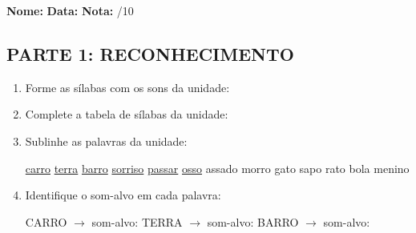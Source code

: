\begin{exercicio}

\noindent\textbf{Nome:} \underline{\hspace{3.2cm}} \quad \textbf{Data:} \underline{\hspace{1.6cm}} \quad \textbf{Nota:} \underline{\hspace{0.9cm}}/10


\subsection*{PARTE 1: RECONHECIMENTO}

\begin{enumerate}

  \item Forme as sílabas com os sons da unidade:

\begin{center}
\end{center}

  \item Complete a tabela de sílabas da unidade:

\begin{center}
\end{center}

  \item Sublinhe as palavras da unidade:

\begin{center}
  \uline{carro} \quad \uline{terra} \quad \uline{barro} \quad \uline{sorriso} \quad \uline{passar} \quad \uline{osso} \quad assado \quad morro \quad gato \quad sapo \quad rato \quad bola \quad menino
\end{center}

  \item Identifique o som-alvo em cada palavra:
  \begin{center}
  CARRO $\rightarrow$ som-alvo: \underline{\hspace{1cm}} \quad TERRA $\rightarrow$ som-alvo: \underline{\hspace{1cm}} \quad BARRO $\rightarrow$ som-alvo: \underline{\hspace{1cm}}
  \end{center}


\end{enumerate}
\end{exercicio}
